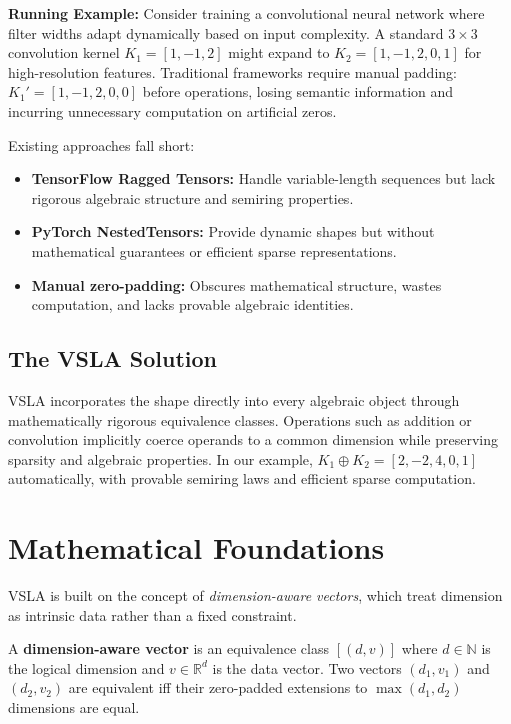 \documentclass[11pt,twocolumn]{article}
\begin{document}
\textbf{Running Example:} Consider training a convolutional neural network where filter widths adapt dynamically based on input complexity. A standard $3 \times 3$ convolution kernel $K_1 = [1, -1, 2]$ might expand to $K_2 = [1, -1, 2, 0, 1]$ for high-resolution features. Traditional frameworks require manual padding: $K_1' = [1, -1, 2, 0, 0]$ before operations, losing semantic information and incurring unnecessary computation on artificial zeros.

Existing approaches fall short:
\begin{itemize}[leftmargin=1.5em]
\item \textbf{TensorFlow Ragged Tensors:} Handle variable-length sequences but lack rigorous algebraic structure and semiring properties.
\item \textbf{PyTorch NestedTensors:} Provide dynamic shapes but without mathematical guarantees or efficient sparse representations.
\item \textbf{Manual zero-padding:} Obscures mathematical structure, wastes computation, and lacks provable algebraic identities.
\end{itemize}

\subsection{The VSLA Solution}
VSLA incorporates the shape directly into every algebraic object through mathematically rigorous equivalence classes.  Operations such as addition or convolution implicitly coerce operands to a common dimension while preserving sparsity and algebraic properties. In our example, $K_1 \oplus K_2 = [2, -2, 4, 0, 1]$ automatically, with provable semiring laws and efficient sparse computation.

\section{Mathematical Foundations}

VSLA is built on the concept of \emph{dimension-aware vectors}, which treat dimension as intrinsic data rather than a fixed constraint.

\begin{tcolorbox}[colback=prelim,colframe=blue!50!black,title=Core Definition]
A \textbf{dimension-aware vector} is an equivalence class $[(d,v)]$ where $d \in \mathbb{N}$ is the logical dimension and $v \in \mathbb{R}^d$ is the data vector. Two vectors $(d_1,v_1)$ and $(d_2,v_2)$ are equivalent iff their zero-padded extensions to $\max(d_1,d_2)$ dimensions are equal.
\end{tcolorbox}
\end{document}
